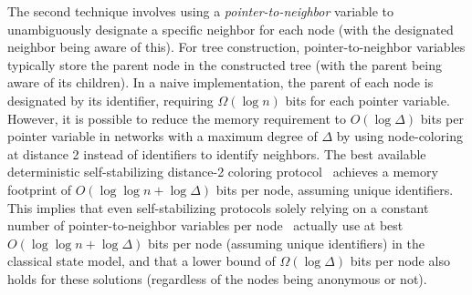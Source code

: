 \documentclass[a4paper, 12pt]{article}
\begin{document}
The second technique involves using a \textit{pointer-to-neighbor} variable to unambiguously designate a specific neighbor for each node (with the designated neighbor being aware of this). For tree construction, pointer-to-neighbor variables typically store the parent node in the constructed tree (with the parent being aware of its children). In a naive implementation, the parent of each node is designated by its identifier, requiring $\Omega(\log n)$ bits for each pointer variable. However, it is possible to reduce the memory requirement to $O(\log \Delta)$ bits per pointer variable in networks with a maximum degree of $\Delta$ by using node-coloring at distance 2 instead of identifiers to identify neighbors. 
The best available deterministic self-stabilizing distance-2 coloring protocol~\cite{BT20} achieves a memory footprint of $O(\log \log n + \log \Delta)$ bits per node, assuming unique identifiers. 
This implies that even self-stabilizing protocols solely relying on a constant number of pointer-to-neighbor variables per node~\cite{J97,DDJL23} actually use at best $O(\log \log n + \log \Delta)$ bits per node (assuming unique identifiers) in the classical state model, and that a lower bound of $\Omega(\log \Delta)$ bits per node also holds for these solutions (regardless of the nodes being anonymous or not).
 
\end{document}
